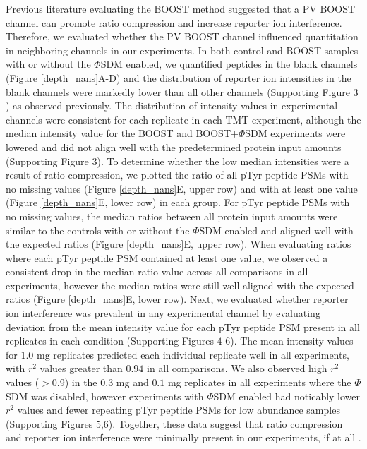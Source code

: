 \documentclass[journal=jprobs,manuscript=article]{achemso}
\begin{document}
Previous literature evaluating the BOOST method suggested that a PV BOOST channel can promote ratio compression and increase reporter ion interference\cite{stopfer2021quantitative}. Therefore, we evaluated whether the PV BOOST channel influenced quantitation in neighboring channels in our experiments. In both control and BOOST samples with or without the $\Phi$SDM enabled, we quantified peptides in the blank channels (Figure \ref{depth_nans}A-D) and the distribution of reporter ion intensities in the blank channels were markedly lower than all other channels (Supporting Figure $3$) as observed previously\cite{chua2021ovalbumin}. The distribution of intensity values in experimental channels were consistent for each replicate in each TMT experiment, although the median intensity value for the BOOST and BOOST$+\Phi$SDM experiments were lowered and did not align well with the predetermined protein input amounts (Supporting Figure $3$). To determine whether the low median intensities were a result of ratio compression, we plotted the ratio of all pTyr peptide PSMs with no missing values (Figure \ref{depth_nans}E, upper row) and with at least one value (Figure \ref{depth_nans}E, lower row) in each group. For pTyr peptide PSMs with no missing values, the median ratios between all protein input amounts were similar to the controls with or without the $\Phi$SDM enabled and aligned well with the expected ratios (Figure \ref{depth_nans}E, upper row). When evaluating ratios where each pTyr peptide PSM contained at least one value, we observed a consistent drop in the median ratio value across all comparisons in all experiments, however the median ratios were still well aligned with the expected ratios (Figure \ref{depth_nans}E, lower row). Next, we evaluated whether reporter ion interference was prevalent in any experimental channel by evaluating deviation from the mean intensity value for each pTyr peptide PSM present in all replicates in each condition (Supporting Figures $4$-$6$). The mean intensity values for $1.0$ mg replicates predicted each individual replicate well in all experiments, with $r^{2}$ values greater than $0.94$ in all comparisons. We also observed high $r^{2}$ values ($>0.9$) in the $0.3$ mg and $0.1$ mg replicates in all experiments where the $\Phi$SDM was disabled, however experiments with $\Phi$SDM enabled had noticably lower $r^{2}$ values and fewer repeating pTyr peptide PSMs for low abundance samples (Supporting Figures $5$,$6$). Together, these data suggest that ratio compression and reporter ion interference were minimally present in our experiments, if at all .
\end{document}
